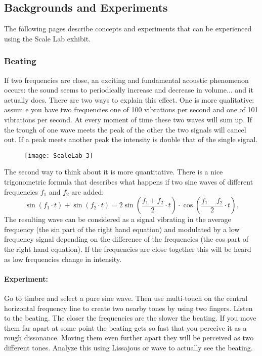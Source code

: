\subsection{Backgrounds and Experiments}
The following pages describe concepts and experiments that can be experienced using the Scale Lab exhibit.

\subsubsection{Beating}
If two frequencies are close, an exciting and fundamental acoustic phenomenon occurs: the sound seems to periodically increase and decrease in volume... and it actually does. There are two ways to explain this effect. One is more qualitative: assum
e you have two frequencies one of 100 vibrations per second and one of 101 vibrations per second. At every moment of time these two waves will sum up. If the trough of one wave meets the peak of the other the two signals will cancel out. If a peak meets another peak the intensity is double that of the single signal. 

\begin{figure}[h]
\centering
\texttt{[image: ScaleLab\_3]}
\end{figure}

The second way to think about it is more quantitative. There is a nice trigonometric formula that describes what happens if two sine waves of different frequencies $f_1$ and $f_2$ are added: 
$$\sin(f_1 \cdot t) + \sin(f_2\cdot t) = 2 \sin\left( \frac{f_1+f_2}{2}\cdot t\right) \cdot \cos\left( \frac{f_1-f_2}{2}\cdot t\right) .$$
The resulting wave can be considered as a signal vibrating in the average frequency (the sin part of the right hand equation) and modulated by a low frequency signal depending on the difference of the frequencies (the cos part of the right hand equation). If the frequencies are close together this will be heard as low frequencies change in intensity.

\paragraph{Experiment:} Go to timbre and select a pure sine wave. Then use multi-touch on the central horizontal frequency line to create two nearby tones by using two fingers. Listen to the beating. The closer the frequencies are the slower the beating. If you move them far apart at some point the beating gets so fast that you perceive it as a rough dissonance. Moving them even further apart they will be perceived as two different tones. Analyze this using Lissajous or wave to actually see the beating.

